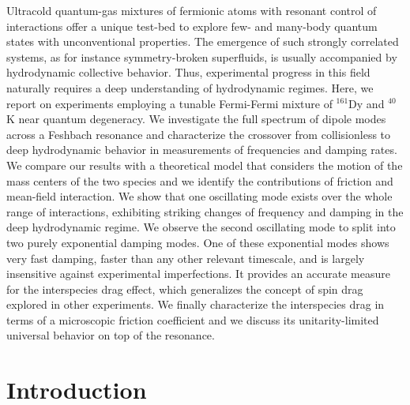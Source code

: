 \newpage
\begin{minipage}{10cm}
Ultracold quantum-gas mixtures of fermionic atoms with resonant control of  interactions offer a unique test-bed to explore few- and many-body quantum states with unconventional properties. 
The emergence of such strongly correlated systems, as for instance symmetry-broken superfluids, is usually accompanied by hydrodynamic collective behavior. Thus, experimental progress in this field naturally requires a deep understanding of hydrodynamic regimes. Here, we report on experiments employing a tunable Fermi-Fermi mixture of $^{161}$Dy and $^{40}$K near quantum degeneracy. We investigate the full spectrum of dipole modes across a Feshbach resonance and characterize the crossover from collisionless to deep hydrodynamic behavior in measurements of frequencies and damping rates. We compare our results with a theoretical model that considers the motion of the mass centers of the two species and we identify the contributions of friction and mean-field interaction.
We show that one oscillating mode exists over the whole range of interactions, exhibiting striking changes of frequency and damping in the deep hydrodynamic regime. We observe the second oscillating mode to split into two purely exponential damping modes. One of these exponential modes shows very fast damping, faster than any other relevant timescale, and is largely insensitive against experimental imperfections. It provides an accurate measure for the interspecies drag effect, which generalizes the concept of spin drag explored in other experiments. {We finally characterize the interspecies drag in terms of a microscopic friction coefficient} and we discuss its unitarity-limited universal behavior on top of the resonance.
\end{minipage}



\section{Introduction}\label{sec:intro}

